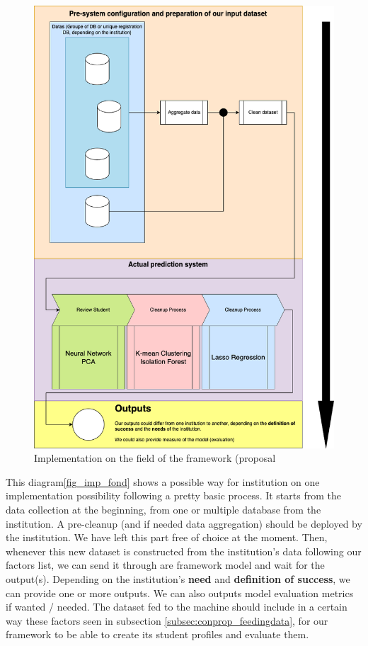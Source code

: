 \documentclass[../main.tex]{subfiles}
\begin{document}
\begin{figure}[H]
    \centering
    \includegraphics[width=1\linewidth]{res//diagram/Fonc imp.png}
    \caption{Implementation on the field of the framework (proposal}
    \label{fig:imp_fonc}
\end{figure}

This diagram\ref{fig_imp_fond} shows a possible way for institution on one implementation possibility following a pretty basic process. It starts from the data collection at the beginning, from one or multiple database from the institution. A pre-cleanup (and if needed data aggregation) should be deployed by the institution. We have left this part free of choice at  the moment.
Then, whenever this new dataset is constructed from the institution's data following our factors list, we can send it through are framework model and wait for the output(s). Depending on the institution's \textbf{need} and \textbf{definition of success}, we can provide one or more outputs. We can also outputs model evaluation metrics if wanted / needed. 
The dataset fed to the machine should include in a certain way these factors seen in subsection \ref{subsec:conprop_feedingdata}, for our framework to be able to create its student profiles and evaluate them.
\end{document}
